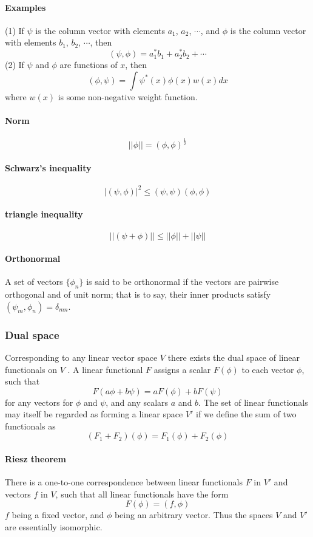 \documentclass{article}
\begin{document}
\paragraph{Examples}
(1) If $\psi$ is the column vector with elements $a_1$, $a_2$, $\cdots$, and $\phi$ is the column vector with elements $b_1$, $b_2$, $\cdots$, then
\[(\psi,\phi) = a_1^*b_1 + a_2^*b_2 + \cdots\]
(2) If $\psi$ and $\phi$ are functions of $x$, then
\[(\phi,\psi) = \int \psi^*(x) \phi(x) w(x) dx\]
where $w(x)$ is some non-negative weight function.
\paragraph{Norm}
\[|| \phi || = (\phi,\phi)^{\frac{1}{2}}\]
\paragraph{Schwarz's inequality}
\[|(\psi,\phi)|^2 \leq (\psi,\psi)(\phi,\phi)\]
\paragraph{triangle inequality}
\[||(\psi+\phi)|| \leq ||\phi|| + ||\psi||\]
\paragraph{Orthonormal}
A set of vectors $\{\phi_n\}$ is said to be orthonormal if the vectors are pairwise orthogonal and of unit norm; that is to say, their inner products satisfy $(\psi_m,\phi_n) = \delta_{mn}$.

\subsubsection{Dual space}
Corresponding to any linear vector space $V$ there exists the dual space of linear functionals on $V$ . A linear functional $F$ assigns a scalar $F(\phi)$ to each vector $\phi$, such that
\[F(a\phi+b\psi) = aF(\phi) + bF(\psi)\]
for any vectors for $\phi$ and $\psi$, and any scalars $a$ and $b$. The set of linear functionals may itself be regarded as forming a linear space $V'$ if we define the sum of two functionals as
\[(F_1+F_2)(\phi) = F_1(\phi) + F_2(\phi)\]
\paragraph{Riesz theorem} There is a one-to-one correspondence between linear functionals $F$ in $V'$ and vectors $f$ in $V$, such that all linear functionals have the form
\[F(\phi) = (f,\phi)\]
$f$ being a fixed vector, and $\phi$ being an arbitrary vector. Thus the spaces $V$ and $V'$ are essentially isomorphic.
\end{document}
